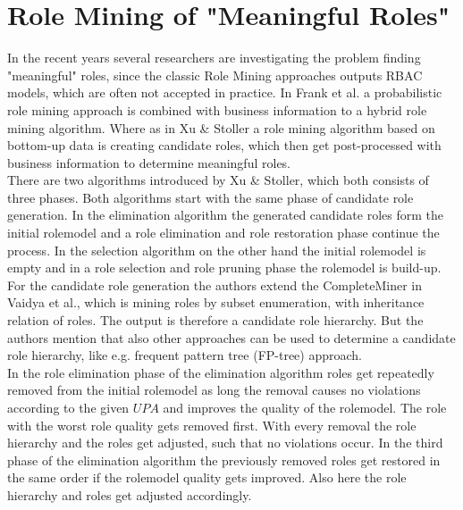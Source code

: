 \section{Role Mining of "Meaningful Roles"}
\label{sec:relatedWork2}
In the recent years several researchers are investigating the problem finding "meaningful" roles, since the classic Role Mining approaches outputs RBAC models, which are often not accepted in practice. In Frank et al.\cite{Frank} a probabilistic role mining approach is combined with business information to a hybrid role mining algorithm. Where as in Xu \& Stoller\cite{Xu} a role mining algorithm based on bottom-up data is creating candidate roles, which then get post-processed with business information to determine meaningful roles.\\
\newline
There are two algorithms introduced by Xu \& Stoller\cite{Xu}, which both consists of three phases. Both algorithms start with the same phase of candidate role generation. In the elimination algorithm the generated candidate roles form the initial rolemodel and a role elimination and role restoration phase continue the process. In the selection algorithm on the other hand the initial rolemodel is empty and in a role selection and role pruning phase the rolemodel is build-up.\\
For the candidate role generation the authors extend the CompleteMiner in Vaidya et al.\cite{Vaidya:2006:RMR:1180405.1180424}, which is mining roles by subset enumeration, with inheritance relation of roles. The output is therefore a candidate role hierarchy. But the authors mention that also other approaches can be used to determine a candidate role hierarchy, like e.g. frequent pattern tree (FP-tree) approach\cite{Han}.\\
In the role elimination phase of the elimination algorithm roles get repeatedly removed from the initial rolemodel as long the removal causes no violations according to the given $UPA$ and improves the quality of the rolemodel. The role with the worst role quality gets removed first. With every removal the role hierarchy and the roles get adjusted, such that no violations occur. In the third phase of the elimination algorithm the previously removed roles get restored in the same order if the rolemodel quality gets improved. Also here the role hierarchy and roles get adjusted accordingly.\\
